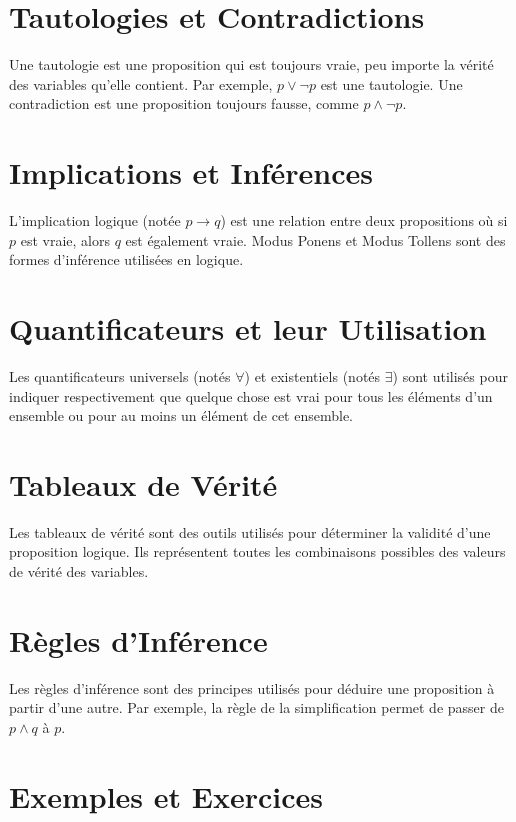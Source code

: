 \documentclass{article}
\begin{document}
\section{Tautologies et Contradictions}
Une tautologie est une proposition qui est toujours vraie, peu importe la vérité des variables qu'elle contient. Par exemple, \( p \lor \neg p \) est une tautologie. Une contradiction est une proposition toujours fausse, comme \( p \land \neg p \).

\section{Implications et Inférences}
L'implication logique (notée \( p \rightarrow q \)) est une relation entre deux propositions où si \( p \) est vraie, alors \( q \) est également vraie. Modus Ponens et Modus Tollens sont des formes d'inférence utilisées en logique.

\section{Quantificateurs et leur Utilisation}
Les quantificateurs universels (notés \( \forall \)) et existentiels (notés \( \exists \)) sont utilisés pour indiquer respectivement que quelque chose est vrai pour tous les éléments d'un ensemble ou pour au moins un élément de cet ensemble.

\section{Tableaux de Vérité}
Les tableaux de vérité sont des outils utilisés pour déterminer la validité d'une proposition logique. Ils représentent toutes les combinaisons possibles des valeurs de vérité des variables.

\section{Règles d'Inférence}
Les règles d'inférence sont des principes utilisés pour déduire une proposition à partir d'une autre. Par exemple, la règle de la simplification permet de passer de \( p \land q \) à \( p \).

\newpage

\section{Exemples et Exercices}
\end{document}
